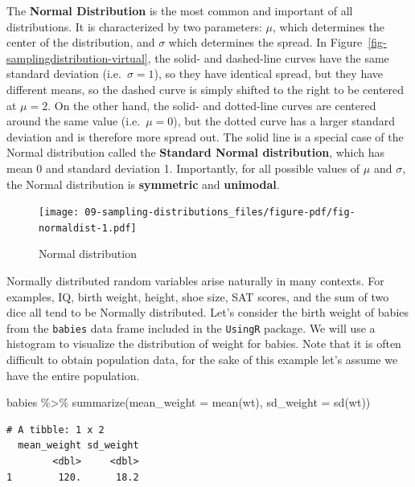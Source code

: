 \documentclass[
  letterpaper,
  DIV=11,
  numbers=noendperiod]{scrreprt}
\newenvironment{Shaded}{\begin{snugshade}}{\end{snugshade}}
\newcommand{\AttributeTok}[1]{\textcolor[rgb]{0.40,0.45,0.13}{#1}}
\newcommand{\FunctionTok}[1]{\textcolor[rgb]{0.28,0.35,0.67}{#1}}
\newcommand{\NormalTok}[1]{\textcolor[rgb]{0.00,0.23,0.31}{#1}}
\newcommand{\SpecialCharTok}[1]{\textcolor[rgb]{0.37,0.37,0.37}{#1}}
\theoremstyle{definition}
\theoremstyle{remark}
\begin{document}
The \textbf{Normal Distribution} is the most common and important of all
distributions. It is characterized by two parameters: \(\mu\), which
determines the center of the distribution, and \(\sigma\) which
determines the spread. In Figure~\ref{fig-samplingdistribution-virtual},
the solid- and dashed-line curves have the same standard deviation
(i.e.~\(\sigma = 1\)), so they have identical spread, but they have
different means, so the dashed curve is simply shifted to the right to
be centered at \(\mu = 2\). On the other hand, the solid- and
dotted-line curves are centered around the same value
(i.e.~\(\mu = 0\)), but the dotted curve has a larger standard deviation
and is therefore more spread out. The solid line is a special case of
the Normal distribution called the \textbf{Standard Normal
distribution}, which has mean 0 and standard deviation 1. Importantly,
for all possible values of \(\mu\) and \(\sigma\), the Normal
distribution is \textbf{symmetric} and \textbf{unimodal}.

\begin{figure}

{\centering \texttt{[image: 09-sampling-distributions\_files/figure-pdf/fig-normaldist-1.pdf]}

}

\caption{\label{fig-normaldist}Normal distribution}

\end{figure}

Normally distributed random variables arise naturally in many contexts.
For examples, IQ, birth weight, height, shoe size, SAT scores, and the
sum of two dice all tend to be Normally distributed. Let's consider the
birth weight of babies from the \texttt{babies} data frame included in
the \texttt{UsingR} package. We will use a histogram to visualize the
distribution of weight for babies. Note that it is often difficult to
obtain population data, for the sake of this example let's assume we
have the entire population.

\begin{Shaded}
\begin{Highlighting}[]
\NormalTok{babies }\SpecialCharTok{\%\textgreater{}\%}
  \FunctionTok{summarize}\NormalTok{(}\AttributeTok{mean\_weight =} \FunctionTok{mean}\NormalTok{(wt),}
            \AttributeTok{sd\_weight =} \FunctionTok{sd}\NormalTok{(wt))}
\end{Highlighting}
\end{Shaded}

\begin{verbatim}
# A tibble: 1 x 2
  mean_weight sd_weight
        <dbl>     <dbl>
1        120.      18.2
\end{verbatim}
\end{document}

